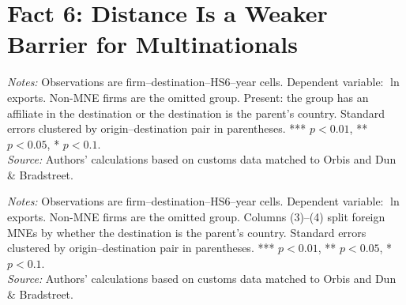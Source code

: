 \documentclass[11pt,a4paper]{article}
\begin{document}
\section{Fact 6: Distance Is a Weaker Barrier for Multinationals}\label{sec:f6_all}
\begin{table}[H]\centering\small%
  \caption{Distance and Firm Exports: Multinationals by Presence at the Destination}%
  \label{tab:t2_all}%
  \par\vspace{3pt}%
  \begin{minipage}{0.95\textwidth}\footnotesize %
  \textit{Notes:} Observations are firm--destination--HS6--year cells. Dependent variable: $\ln$ exports. Non-MNE firms are the omitted group. Present: the group has an affiliate in the destination or the destination is the parent's country. Standard errors clustered by origin--destination pair in parentheses. *** $p<0.01$, ** $p<0.05$, * $p<0.1$.\\[3pt]%
  \textit{Source:} Authors' calculations based on customs data matched to Orbis and Dun \& Bradstreet.%
  \end{minipage}%
  \end{table}
\begin{table}[H]\centering\small%
  \caption{Distance and Firm Exports: Foreign and Domestic Multinationals}%
  \label{tab:dist_all}%
  \par\vspace{3pt}%
  \begin{minipage}{0.95\textwidth}\footnotesize %
  \textit{Notes:} Observations are firm--destination--HS6--year cells. Dependent variable: $\ln$ exports. Non-MNE firms are the omitted group. Columns (3)--(4) split foreign MNEs by whether the destination is the parent's country. Standard errors clustered by origin--destination pair in parentheses. *** $p<0.01$, ** $p<0.05$, * $p<0.1$.\\[3pt]%
  \textit{Source:} Authors' calculations based on customs data matched to Orbis and Dun \& Bradstreet.%
  \end{minipage}%
  \end{table}
\end{document}
